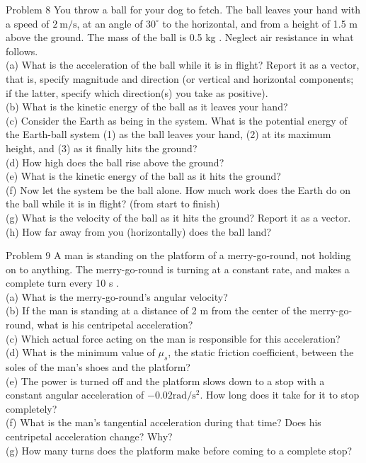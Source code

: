 \documentclass[10pt]{article}
\begin{document}
Problem 8 You throw a ball for your dog to fetch. The ball leaves your hand with a speed of $2 \mathrm{~m} / \mathrm{s}$, at an angle of $30^{\circ}$ to the horizontal, and from a height of 1.5 m above the ground. The mass of the ball is 0.5 kg . Neglect air resistance in what follows.\\
(a) What is the acceleration of the ball while it is in flight? Report it as a vector, that is, specify magnitude and direction (or vertical and horizontal components; if the latter, specify which direction(s) you take as positive).\\
(b) What is the kinetic energy of the ball as it leaves your hand?\\
(c) Consider the Earth as being in the system. What is the potential energy of the Earth-ball system (1) as the ball leaves your hand, (2) at its maximum height, and (3) as it finally hits the ground?\\
(d) How high does the ball rise above the ground?\\
(e) What is the kinetic energy of the ball as it hits the ground?\\
(f) Now let the system be the ball alone. How much work does the Earth do on the ball while it is in flight? (from start to finish)\\
(g) What is the velocity of the ball as it hits the ground? Report it as a vector.\\
(h) How far away from you (horizontally) does the ball land?

Problem 9 A man is standing on the platform of a merry-go-round, not holding on to anything. The merry-go-round is turning at a constant rate, and makes a complete turn every 10 s .\\
(a) What is the merry-go-round's angular velocity?\\
(b) If the man is standing at a distance of 2 m from the center of the merry-go-round, what is his centripetal acceleration?\\
(c) Which actual force acting on the man is responsible for this acceleration?\\
(d) What is the minimum value of $\mu_{s}$, the static friction coefficient, between the soles of the man's shoes and the platform?\\
(e) The power is turned off and the platform slows down to a stop with a constant angular acceleration of $-0.02 \mathrm{rad} / \mathrm{s}^{2}$. How long does it take for it to stop completely?\\
(f) What is the man's tangential acceleration during that time? Does his centripetal acceleration change? Why?\\
(g) How many turns does the platform make before coming to a complete stop?
\end{document}
